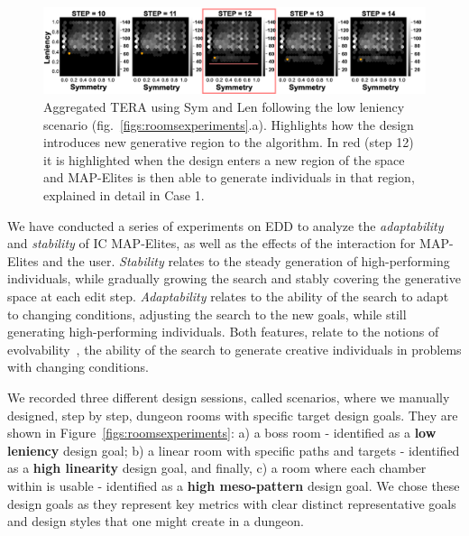 

\begin{figure}[t!]
\centerline{\includegraphics[width=\textwidth]{figures/exp1-lowlen-exploring_new_area/accumulative__X-sym-Y-len-simplified-2.png}}
\caption{Aggregated TERA using Sym and Len following the low leniency scenario (fig.~\ref{figs:roomsexperiments}.a). Highlights how the design introduces new generative region to the algorithm. In red (step 12) it is highlighted when the design enters a new region of the space and MAP-Elites is then able to generate individuals in that region, explained in detail in Case 1.}
\label{figs:exp1}
\end{figure}

We have conducted a series of experiments on EDD to analyze the \emph{adaptability} and \emph{stability} of IC MAP-Elites, as well as the effects of the interaction for MAP-Elites and the user. \emph{Stability} relates to the steady generation of high-performing individuals, while gradually growing the search and stably covering the generative space at each edit step. \emph{Adaptability} relates to the ability of the search to adapt to changing conditions, adjusting the search to the new goals, while still generating high-performing individuals. Both features, relate to the notions of evolvability~, the ability of the search to generate creative individuals in problems with changing conditions.


We recorded three different design sessions, called scenarios, where we manually designed, step by step, dungeon rooms with specific target design goals. They are shown in Figure~\ref{figs:roomsexperiments}: a) a boss room - identified as a \textbf{low leniency} design goal; b) a linear room with specific paths and targets - identified as a \textbf{high linearity} design goal, and finally, c) a room where each chamber within is usable - identified as a \textbf{high meso-pattern} design goal. We chose these design goals as they represent key metrics with clear distinct representative goals and design styles that one might create in a dungeon.

